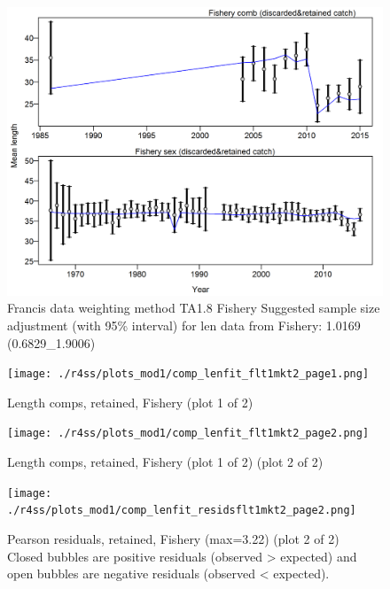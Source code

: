 \documentclass[12pt,]{article}
\begin{document}
\begin{figure}
\centering
\includegraphics{./r4ss/plots_mod1/comp_lenfit_data_weighting_TA1.8_Fishery.png}
\caption{Francis data weighting method TA1.8 Fishery Suggested sample
size adjustment (with 95\% interval) for len data from Fishery: 1.0169
(0.6829\_1.9006)
\label{fig:mod1_4_comp_lenfit_data_weighting_TA1.8_Fishery}}
\end{figure}

\begin{figure}
\centering
\texttt{[image: ./r4ss/plots\_mod1/comp\_lenfit\_flt1mkt2\_page1.png]}
\caption{Length comps, retained, Fishery (plot 1 of 2)
\label{fig:mod1_5_comp_lenfit_flt1mkt2_page1}}
\end{figure}

\begin{figure}
\centering
\texttt{[image: ./r4ss/plots\_mod1/comp\_lenfit\_flt1mkt2\_page2.png]}
\caption{Length comps, retained, Fishery (plot 1 of 2) (plot 2 of 2)
\label{fig:mod1_6_comp_lenfit_flt1mkt2_page2}}
\end{figure}

\begin{figure}
\centering
\texttt{[image: ./r4ss/plots\_mod1/comp\_lenfit\_residsflt1mkt2\_page2.png]}
\caption{Pearson residuals, retained, Fishery (max=3.22) (plot 2 of 2)\\
Closed bubbles are positive residuals (observed \textgreater{} expected)
and open bubbles are negative residuals (observed \textless{} expected).
\label{fig:mod1_7_comp_lenfit_residsflt1mkt2_page2}}
\end{figure}
\end{document}
